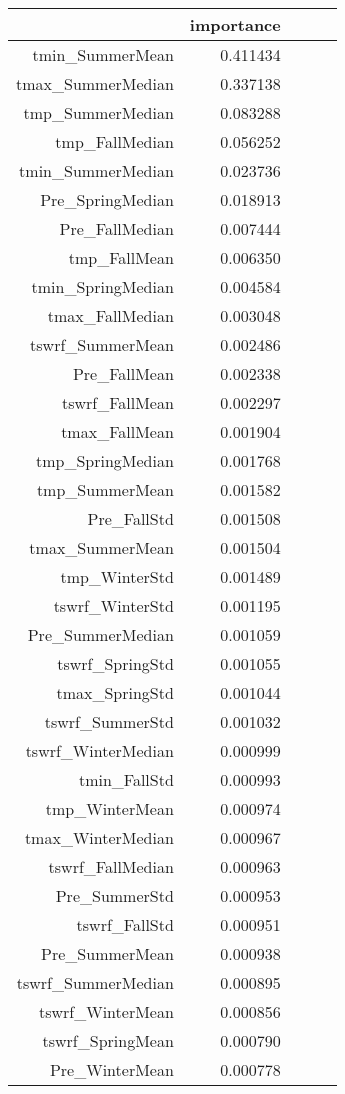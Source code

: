 \begin{tabular}{rrrrr}
\toprule
 & importance \\
\midrule
tmin_SummerMean & 0.411434 \\
tmax_SummerMedian & 0.337138 \\
tmp_SummerMedian & 0.083288 \\
tmp_FallMedian & 0.056252 \\
tmin_SummerMedian & 0.023736 \\
Pre_SpringMedian & 0.018913 \\
Pre_FallMedian & 0.007444 \\
tmp_FallMean & 0.006350 \\
tmin_SpringMedian & 0.004584 \\
tmax_FallMedian & 0.003048 \\
tswrf_SummerMean & 0.002486 \\
Pre_FallMean & 0.002338 \\
tswrf_FallMean & 0.002297 \\
tmax_FallMean & 0.001904 \\
tmp_SpringMedian & 0.001768 \\
tmp_SummerMean & 0.001582 \\
Pre_FallStd & 0.001508 \\
tmax_SummerMean & 0.001504 \\
tmp_WinterStd & 0.001489 \\
tswrf_WinterStd & 0.001195 \\
Pre_SummerMedian & 0.001059 \\
tswrf_SpringStd & 0.001055 \\
tmax_SpringStd & 0.001044 \\
tswrf_SummerStd & 0.001032 \\
tswrf_WinterMedian & 0.000999 \\
tmin_FallStd & 0.000993 \\
tmp_WinterMean & 0.000974 \\
tmax_WinterMedian & 0.000967 \\
tswrf_FallMedian & 0.000963 \\
Pre_SummerStd & 0.000953 \\
tswrf_FallStd & 0.000951 \\
Pre_SummerMean & 0.000938 \\
tswrf_SummerMedian & 0.000895 \\
tswrf_WinterMean & 0.000856 \\
tswrf_SpringMean & 0.000790 \\
Pre_WinterMean & 0.000778 \\

\end{tabular}
